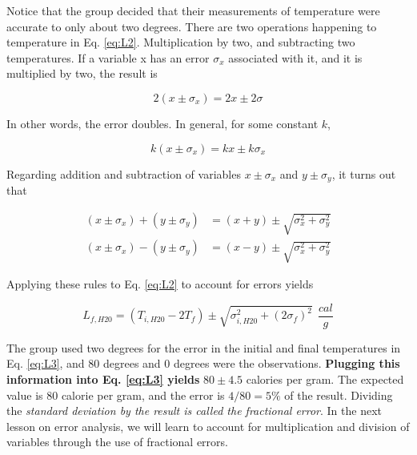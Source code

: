 \documentclass[12pt]{article}
\begin{document}
Notice that the group decided that their measurements of temperature were accurate to only about two degrees.  There are two operations happening to temperature in Eq. \ref{eq:L2}.  Multiplication by two, and subtracting two temperatures.  If a variable x has an error $\sigma_x$ associated with it, and it is multiplied by two, the result is

\begin{equation}
2(x\pm \sigma_x) = 2x \pm 2\sigma
\end{equation}

In other words, the error doubles.  In general, for some constant $k$,

\begin{equation}
k(x\pm \sigma_x) = kx \pm k\sigma_x
\end{equation}

Regarding addition and subtraction of variables $x\pm \sigma_x$ and $y\pm \sigma_y$, it turns out that

\begin{align}
(x\pm \sigma_x) + (y\pm \sigma_y) &= (x+y) \pm \sqrt{\sigma_x^2 + \sigma_y^2} \\
(x\pm \sigma_x) - (y\pm \sigma_y) &= (x-y) \pm \sqrt{\sigma_x^2 + \sigma_y^2}
\end{align}

Applying these rules to Eq. \ref{eq:L2} to account for errors yields

\begin{equation}
L_{f,H20} = \left( T_{i,H20} - 2T_f\right) \pm \sqrt{\sigma_{i,H20}^2 + (2\sigma_f)^2}~~\frac{cal}{g} \label{eq:L3}
\end{equation}

The group used two degrees for the error in the initial and final temperatures in Eq. \ref{eq:L3}, and 80 degrees and 0 degrees were the observations.  \textbf{Plugging this information into Eq. \ref{eq:L3} yields} $80 \pm 4.5$ calories per gram.  The expected value is 80 calorie per gram, and the error is $4/80 = 5\%$ of the result.  Dividing the \textit{standard deviation by the result is called the fractional error}.  In the next lesson on error analysis, we will learn to account for multiplication and division of variables through the use of fractional errors.
\end{document}
